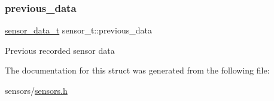 \subsubsection{\texorpdfstring{previous\+\_\+data}{previous\_data}}
{\footnotesize\ttfamily \hyperlink{unionsensor__data__t}{sensor\+\_\+data\+\_\+t} sensor\+\_\+t\+::previous\+\_\+data}

Previous recorded sensor data 

The documentation for this struct was generated from the following file\+:\begin{DoxyCompactItemize}
\item 
sensors/\hyperlink{sensors_8h}{sensors.\+h}\end{DoxyCompactItemize}
